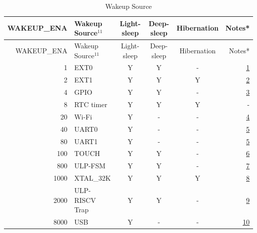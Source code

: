 \documentclass[main\_\_EN.tex]{subfiles}
\begin{document}
\begin{longtable}{ | r | l | c | c | c | r | }
    \caption{Wakeup Source} \label{table:wakeup source} \\
    \hline
    \rowcolor{lightgray}
    WAKEUP\_ENA & Wakeup Source\hyperlink{wakeup-sources-note1}{$^{11}$} &  Light-sleep & Deep-sleep & Hibernation & Notes* \\
    \hline
    \endfirsthead

    \hline
    \rowcolor{lightgray}
    WAKEUP\_ENA & Wakeup Source\hyperlink{wakeup-sources-note1}{$^{11}$} &  Light-sleep & Deep-sleep & Hibernation & Notes* \\
    \hline
    \endhead

    \hline
    \endfoot

    \hline
    \endlastfoot

    \hexprefix{}1 & EXT0 & Y & Y & - & \hyperlink{wakeup-sources-note1}{1} \\
    \hline
    \hexprefix{}2 & EXT1 & Y & Y & Y & \hyperlink{wakeup-sources-note2}{2} \\
    \hline
    \hexprefix{}4 & GPIO & Y & Y & - & \hyperlink{wakeup-sources-note3}{3} \\
    \hline
    \hexprefix{}8 & RTC timer & Y & Y & Y & -\\
    \hline
    \hexprefix{}20 & Wi-Fi & Y & - & - & \hyperlink{wakeup-sources-note5}{4} \\
    \hline
    \hexprefix{}40 & UART0 & Y & - & - & \hyperlink{wakeup-sources-note6}{5} \\
    \hline
    \hexprefix{}80 & UART1 & Y & - & - & \hyperlink{wakeup-sources-note6}{5} \\
    \hline
    \hexprefix{}100 & TOUCH & Y & Y & - &  \hyperlink{wakeup-sources-note7}{6}\\
    \hline
    \hexprefix{}800 & ULP-FSM & Y & Y & -  & \hyperlink{wakeup-sources-note8}{7} \\
    \hline
    \hexprefix{}1000 & XTAL\_32K & Y & Y & Y  & \hyperlink{wakeup-sources-note9}{8} \\
    \hline
    \hexprefix{}2000 & ULP-RISCV Trap & Y & Y & -  & \hyperlink{wakeup-sources-note10}{9} \\
    \hline
    \hexprefix{}8000 & USB & Y & - & - & \hyperlink{wakeup-sources-note11}{10} \\
    \hline
\end{longtable}
\end{document}
